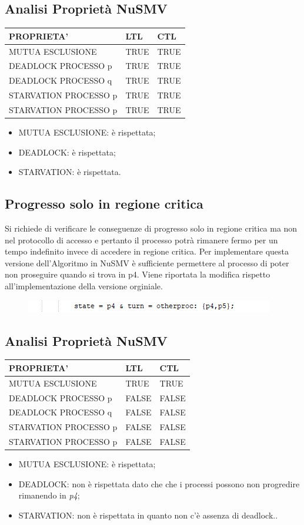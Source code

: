 \documentclass{article}
\begin{document}
\subsection{Analisi Proprietà NuSMV}
\begin{tabular}{|p{6cm}||p{3cm}|p{3cm}|}
\hline
PROPRIETA' & LTL & CTL\\
\hline
 MUTUA ESCLUSIONE&TRUE&TRUE \\
 DEADLOCK PROCESSO p&TRUE&TRUE\\
 DEADLOCK PROCESSO q&TRUE&TRUE\\
 STARVATION PROCESSO p&TRUE&TRUE\\
 STARVATION PROCESSO p&TRUE&TRUE\\
\hline
\end{tabular}
\begin{itemize}
    \item MUTUA ESCLUSIONE: è rispettata;
    \item DEADLOCK: è rispettata;
    \item STARVATION: è rispettata.
\end{itemize}
\subsection{Progresso solo in regione critica}
Si richiede di verificare le conseguenze di progresso solo in regione critica ma non nel protocollo di accesso e pertanto il processo potrà rimanere fermo per un tempo indefinito invece di accedere in regione critica. Per implementare questa versione dell'Algoritmo in NuSMV è sufficiente permettere al processo di poter non proseguire quando si trova in p4. Viene riportata la modifica rispetto all'implementazione della versione orginiale.
\begin{figure}[h] 
\centering
\includegraphics[scale=1]{versionediversa.png}
\end{figure}

\subsection{Analisi Proprietà NuSMV}
\begin{tabular}{|p{6cm}||p{3cm}|p{3cm}|}
\hline
PROPRIETA' & LTL & CTL\\
\hline
 MUTUA ESCLUSIONE&TRUE&TRUE \\
 DEADLOCK PROCESSO p&FALSE&FALSE\\
 DEADLOCK PROCESSO q&FALSE&FALSE\\
 STARVATION PROCESSO p&FALSE&FALSE\\
 STARVATION PROCESSO p&FALSE&FALSE\\
\hline
\end{tabular}
\begin{itemize}
    \item MUTUA ESCLUSIONE: è rispettata;
    \item DEADLOCK: non è rispettata dato che che i processi possono non progredire rimanendo in \textit{p4};
    \item STARVATION: non è rispettata in quanto non c'è assenza di deadlock..
\end{itemize}
\end{document}

